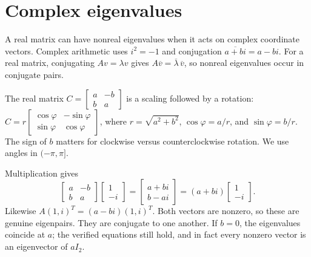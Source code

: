 \section{Complex eigenvalues}
A real matrix can have nonreal eigenvalues when it acts on complex coordinate vectors. Complex arithmetic uses $i^2=-1$ and conjugation $\overline{a+bi}=a-bi$. For a real matrix, conjugating $Av=\lambda v$ gives $A\overline v=\overline\lambda\,\overline v$, so nonreal eigenvalues occur in conjugate pairs.

The real matrix $C=\left[\begin{smallmatrix}a&-b\\b&a\end{smallmatrix}\right]$ is a scaling followed by a rotation: $C=r\left[\begin{smallmatrix}\cos\varphi&-\sin\varphi\\\sin\varphi&\cos\varphi\end{smallmatrix}\right]$, where $r=\sqrt{a^2+b^2}$, $\cos\varphi=a/r$, and $\sin\varphi=b/r$. The sign of $b$ matters for clockwise versus counterclockwise rotation. We use angles in $(-\pi,\pi]$.

Multiplication gives
\[
\begin{bmatrix}a&-b\\b&a\end{bmatrix}\begin{bmatrix}1\\-i\end{bmatrix}
=\begin{bmatrix}a+bi\\b-ai\end{bmatrix}
=(a+bi)\begin{bmatrix}1\\-i\end{bmatrix}.
\]
Likewise $A(1,i)^T=(a-bi)(1,i)^T$. Both vectors are nonzero, so these are genuine eigenpairs. They are conjugate to one another. If $b=0$, the eigenvalues coincide at $a$; the verified equations still hold, and in fact every nonzero vector is an eigenvector of $aI_2$.

